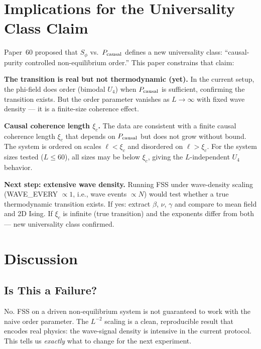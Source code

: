 \documentclass[12pt,a4paper]{article}
\begin{document}
\section{Implications for the Universality Class Claim}
\label{sec:universality}

Paper~60 proposed that $S_\phi$ vs.\ $P_{\rm causal}$ defines a new universality class:
``causal-purity controlled non-equilibrium order.''
This paper constrains that claim:

\textbf{The transition is real but not thermodynamic (yet).}
In the current setup, the phi-field does order (bimodal $U_4$) when
$P_{\rm causal}$ is sufficient, confirming the transition exists.
But the order parameter vanishes as $L \to \infty$ with fixed wave density
--- it is a finite-size coherence effect.

\textbf{Causal coherence length $\xi_c$.}
The data are consistent with a finite causal coherence length $\xi_c$
that depends on $P_{\rm causal}$ but does not grow without bound.
The system is ordered on scales $\ell < \xi_c$ and disordered on $\ell > \xi_c$.
For the system sizes tested ($L \leq 60$), all sizes may be below $\xi_c$,
giving the $L$-independent $U_4$ behavior.

\textbf{Next step: extensive wave density.}
Running FSS under wave-density scaling
(WAVE\_EVERY $\propto 1$, i.e., wave events $\propto N$)
would test whether a true thermodynamic transition exists.
If yes: extract $\beta$, $\nu$, $\gamma$ and compare to mean field and 2D Ising.
If $\xi_c$ is infinite (true transition) and the exponents differ from both ---
new universality class confirmed.

\section{Discussion}
\label{sec:discussion}

\subsection{Is This a Failure?}

No. FSS on a driven non-equilibrium system is not guaranteed to work
with the naive order parameter.
The $L^{-2}$ scaling is a clean, reproducible result that encodes real physics:
the wave-signal density is intensive in the current protocol.
This tells us \emph{exactly} what to change for the next experiment.
\end{document}
